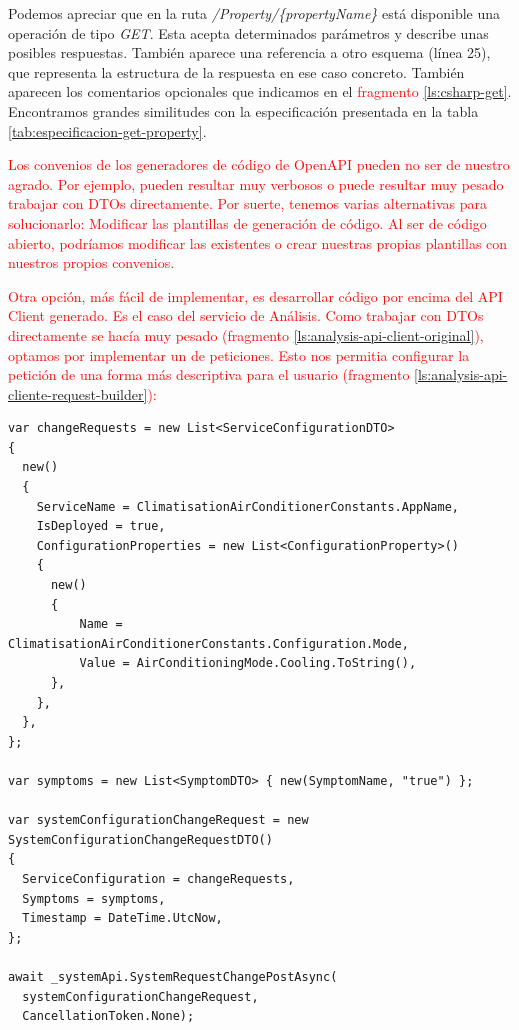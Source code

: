 Podemos apreciar que en la ruta \emph{/Property/\{propertyName\}} está disponible una operación de tipo \emph{GET}. Esta acepta determinados parámetros y describe unas posibles respuestas. También aparece una referencia a otro esquema (línea 25), que representa la estructura de la respuesta en ese caso concreto. También aparecen los comentarios opcionales que indicamos en el \textcolor{red}{fragmento} \ref{ls:csharp-get}. Encontramos grandes similitudes con la especificación presentada en la tabla \ref{tab:especificacion-get-property}.

\textcolor{red}{Los convenios de los generadores de código de OpenAPI pueden no ser de nuestro agrado. Por ejemplo, pueden resultar muy verbosos o puede resultar muy pesado trabajar con DTOs directamente. Por suerte, tenemos varias alternativas para solucionarlo: Modificar las plantillas de generación de código. Al ser de código abierto, podríamos modificar las existentes o crear nuestras propias plantillas con nuestros propios convenios.}

\textcolor{red}{Otra opción, más fácil de implementar, es desarrollar código por encima del API Client generado. Es el caso del servicio de Análisis. Como trabajar con DTOs directamente se hacía muy pesado (fragmento \ref{ls:analysis-api-client-original}), optamos por implementar un  de peticiones. Esto nos permitia configurar la petición de una forma más descriptiva para el usuario (fragmento \ref{ls:analysis-api-cliente-request-builder}):}

\begin{lstlisting}[language={[Sharp]C},caption={Implementación de petición original. Trabajar con DTOs era muy verboso.},captionpos=b, label=ls:analysis-api-client-original]
var changeRequests = new List<ServiceConfigurationDTO>
{
  new()
  {
    ServiceName = ClimatisationAirConditionerConstants.AppName,
    IsDeployed = true,
    ConfigurationProperties = new List<ConfigurationProperty>()
    {
      new()
      {
          Name = ClimatisationAirConditionerConstants.Configuration.Mode,
          Value = AirConditioningMode.Cooling.ToString(),
      },
    },
  },
};

var symptoms = new List<SymptomDTO> { new(SymptomName, "true") };

var systemConfigurationChangeRequest = new SystemConfigurationChangeRequestDTO()
{
  ServiceConfiguration = changeRequests,
  Symptoms = symptoms,
  Timestamp = DateTime.UtcNow,
};

await _systemApi.SystemRequestChangePostAsync(
  systemConfigurationChangeRequest,
  CancellationToken.None);
\end{lstlisting}


